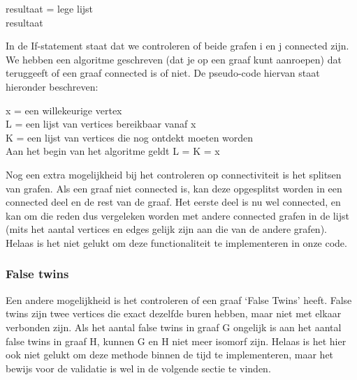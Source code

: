 \documentclass{article}
\begin{document}
\begin{algorithm}[H]
\begin{algorithm}[H]
	resultaat = lege lijst\\
	\Return resultaat
\end{algorithm}
\vspace{5mm}

In de If-statement staat dat we controleren of beide grafen i en j connected zijn. We hebben een algoritme geschreven (dat je op een graaf kunt aanroepen) dat teruggeeft of een graaf connected is of niet. De pseudo-code hiervan staat hieronder beschreven:\\

\begin{algorithm}[H]
	x = een willekeurige vertex\\
	L = een lijst van vertices bereikbaar vanaf x\\
	K = een lijst van vertices die nog ontdekt moeten worden\\
	Aan het begin van het algoritme geldt L = K = x\\


\end{algorithm}
\vspace{5mm}

Nog een extra mogelijkheid bij het controleren op connectiviteit is het splitsen van grafen. Als een graaf niet connected is, kan deze opgesplitst worden in een connected deel en de rest van de graaf. Het eerste deel is nu wel connected, en kan om die reden dus vergeleken worden met andere connected grafen in de lijst (mits het aantal vertices en edges gelijk zijn aan die van de andere grafen). Helaas is het niet gelukt om deze functionaliteit te implementeren in onze code.

\subsubsection{False twins}
Een andere mogelijkheid is het controleren of een graaf `False Twins' heeft. False twins zijn twee vertices die exact dezelfde buren hebben, maar niet met elkaar verbonden zijn. Als het aantal false twins in graaf G ongelijk is aan het aantal false twins in graaf H, kunnen G en H niet meer isomorf zijn. Helaas is het hier ook niet gelukt om deze methode binnen de tijd te implementeren, maar het bewijs voor de validatie is wel in de volgende sectie te vinden.


\end{algorithm}
\end{document}
